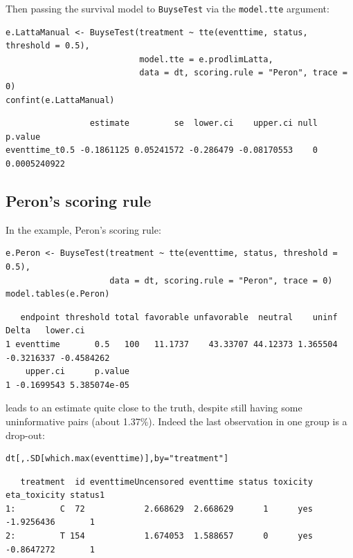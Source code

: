 \documentclass[12pt]{article}
\begin{document}
Then passing the survival model to \texttt{BuyseTest} via the \texttt{model.tte} argument:
\lstset{language=r,label= ,caption= ,captionpos=b,numbers=none}
\begin{lstlisting}
e.LattaManual <- BuyseTest(treatment ~ tte(eventtime, status, threshold = 0.5),
                           model.tte = e.prodlimLatta,
                           data = dt, scoring.rule = "Peron", trace = 0)
confint(e.LattaManual)
\end{lstlisting}

\begin{verbatim}
                 estimate         se  lower.ci    upper.ci null      p.value
eventtime_t0.5 -0.1861125 0.05241572 -0.286479 -0.08170553    0 0.0005240922
\end{verbatim}

\subsection{Peron's scoring rule}
\label{sec:org94a634f}

In the example, Peron's scoring rule:
\lstset{language=r,label= ,caption= ,captionpos=b,numbers=none}
\begin{lstlisting}
e.Peron <- BuyseTest(treatment ~ tte(eventtime, status, threshold = 0.5),
                     data = dt, scoring.rule = "Peron", trace = 0)
model.tables(e.Peron)
\end{lstlisting}

\begin{verbatim}
   endpoint threshold total favorable unfavorable  neutral    uninf      Delta   lower.ci
1 eventtime       0.5   100   11.1737    43.33707 44.12373 1.365504 -0.3216337 -0.4584262
    upper.ci      p.value
1 -0.1699543 5.385074e-05
\end{verbatim}


leads to an estimate quite close to the truth, despite still having
some uninformative pairs (about 1.37\%). Indeed the last observation in
one group is a drop-out:
\lstset{language=r,label= ,caption= ,captionpos=b,numbers=none}
\begin{lstlisting}
dt[,.SD[which.max(eventtime)],by="treatment"]
\end{lstlisting}

\begin{verbatim}
   treatment  id eventtimeUncensored eventtime status toxicity eta_toxicity status1
1:         C  72            2.668629  2.668629      1      yes   -1.9256436       1
2:         T 154            1.674053  1.588657      0      yes   -0.8647272       1
\end{verbatim}
\end{document}

